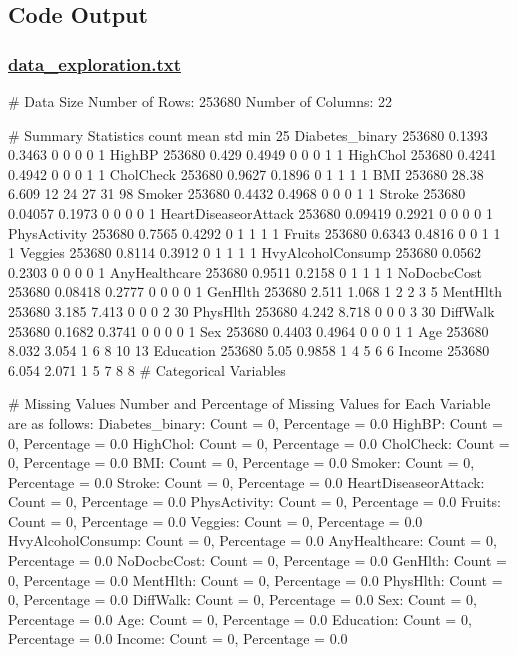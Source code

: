 \documentclass[11pt]{article}
\begin{document}
\subsection{Code Output}\hypertarget{file-data-exploration-txt}{}

\subsubsection*{\hyperlink{code-Data Exploration-data-exploration-txt}{data\_exploration.txt}}

\begin{codeoutput}
# Data Size
Number of Rows: 253680
Number of Columns: 22

# Summary Statistics
                      count    mean    std  min  25%
Diabetes_binary      253680  0.1393 0.3463    0    0    0    0    1
HighBP               253680   0.429 0.4949    0    0    0    1    1
HighChol             253680  0.4241 0.4942    0    0    0    1    1
CholCheck            253680  0.9627 0.1896    0    1    1    1    1
BMI                  253680   28.38  6.609   12   24   27   31   98
Smoker               253680  0.4432 0.4968    0    0    0    1    1
Stroke               253680 0.04057 0.1973    0    0    0    0    1
HeartDiseaseorAttack 253680 0.09419 0.2921    0    0    0    0    1
PhysActivity         253680  0.7565 0.4292    0    1    1    1    1
Fruits               253680  0.6343 0.4816    0    0    1    1    1
Veggies              253680  0.8114 0.3912    0    1    1    1    1
HvyAlcoholConsump    253680  0.0562 0.2303    0    0    0    0    1
AnyHealthcare        253680  0.9511 0.2158    0    1    1    1    1
NoDocbcCost          253680 0.08418 0.2777    0    0    0    0    1
GenHlth              253680   2.511  1.068    1    2    2    3    5
MentHlth             253680   3.185  7.413    0    0    0    2   30
PhysHlth             253680   4.242  8.718    0    0    0    3   30
DiffWalk             253680  0.1682 0.3741    0    0    0    0    1
Sex                  253680  0.4403 0.4964    0    0    0    1    1
Age                  253680   8.032  3.054    1    6    8   10   13
Education            253680    5.05 0.9858    1    4    5    6    6
Income               253680   6.054  2.071    1    5    7    8    8
# Categorical Variables

# Missing Values
Number and Percentage of Missing Values for Each Variable are as follows:
Diabetes_binary: Count = 0, Percentage = 0.0%
HighBP: Count = 0, Percentage = 0.0%
HighChol: Count = 0, Percentage = 0.0%
CholCheck: Count = 0, Percentage = 0.0%
BMI: Count = 0, Percentage = 0.0%
Smoker: Count = 0, Percentage = 0.0%
Stroke: Count = 0, Percentage = 0.0%
HeartDiseaseorAttack: Count = 0, Percentage = 0.0%
PhysActivity: Count = 0, Percentage = 0.0%
Fruits: Count = 0, Percentage = 0.0%
Veggies: Count = 0, Percentage = 0.0%
HvyAlcoholConsump: Count = 0, Percentage = 0.0%
AnyHealthcare: Count = 0, Percentage = 0.0%
NoDocbcCost: Count = 0, Percentage = 0.0%
GenHlth: Count = 0, Percentage = 0.0%
MentHlth: Count = 0, Percentage = 0.0%
PhysHlth: Count = 0, Percentage = 0.0%
DiffWalk: Count = 0, Percentage = 0.0%
Sex: Count = 0, Percentage = 0.0%
Age: Count = 0, Percentage = 0.0%
Education: Count = 0, Percentage = 0.0%
Income: Count = 0, Percentage = 0.0%


\end{codeoutput}
\end{document}
